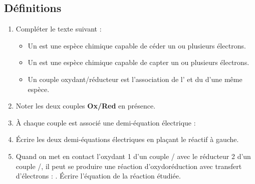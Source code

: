 \documentclass[a4paper,12pt,fleqn]{article}%
\begin{document}
    \subsection{Définitions}
    \begin{enumerate}[resume]
        \item Compléter le texte suivant :
    \begin{cours}
        \begin{itemize}
            \item Un \hspace{5em} est une espèce chimique capable de céder un ou plusieurs électrons.
            \item Un \hspace{5em} est une espèce chimique capable de capter un ou plusieurs électrons.
            \item Un couple oxydant/réducteur est l'association de l'\hspace{5em} et du \hspace{5em} d'une même espèce.
        \end{itemize}
    \end{cours}
        \item Noter les deux couples \textbf{Ox/Red} en présence.
        \item À chaque couple est associé une demi-équation électrique : 
        \item Écrire les deux demi-équations électriques en plaçant le réactif à gauche.
        \item Quand on met en contact l'oxydant 1 d'un couple / avec le réducteur 2 d'un couple /, il peut se produire une réaction d'oxydoréduction avec transfert d'électrons : . Écrire l'équation de la réaction étudiée. 
    \end{enumerate}

\newpage
\end{document}
